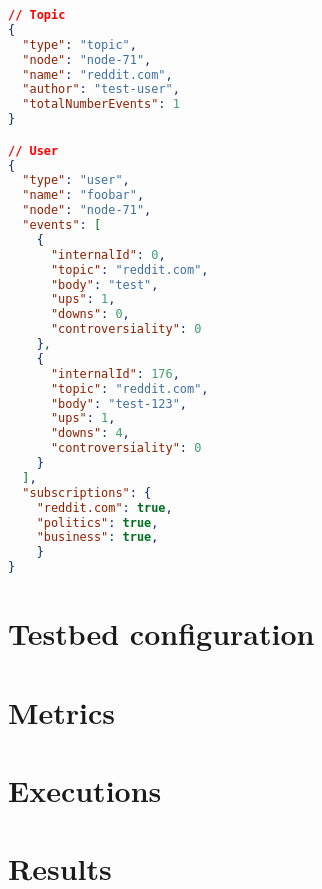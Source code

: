 \begin{lstlisting}[language=JSON, float, caption={Data example to be used in testbed},label={dataset-output}]
// Topic
{
  "type": "topic",
  "node": "node-71",
  "name": "reddit.com",
  "author": "test-user",
  "totalNumberEvents": 1
}

// User
{
  "type": "user",
  "name": "foobar",
  "node": "node-71",
  "events": [
    {
      "internalId": 0,
      "topic": "reddit.com",
      "body": "test",
      "ups": 1,
      "downs": 0,
      "controversiality": 0
    },
    {
      "internalId": 176,
      "topic": "reddit.com",
      "body": "test-123",
      "ups": 1,
      "downs": 4,
      "controversiality": 0
    }
  ],
  "subscriptions": {
  	"reddit.com": true,
  	"politics": true,
  	"business": true,
	}
}
\end{lstlisting}


\section{Testbed configuration}\label{testbed-configuration}

\section{Metrics}\label{metrics}

\section{Executions}\label{executions}

\section{Results}\label{results}
